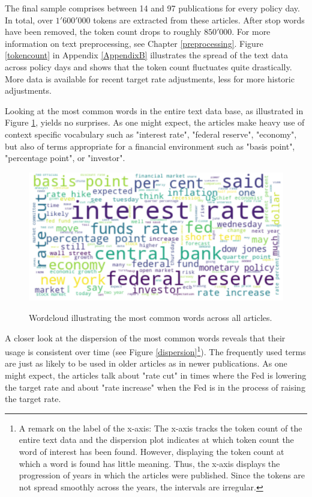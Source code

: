 \documentclass[11pt,a4paper,english,oneside]{book}
\numberwithin{equation}{chapter}
\begin{document}
The final sample comprises between 14 and 97 publications for every policy day. In total, over $1'600'000$ tokens are extracted from these articles. After stop words have been removed, the token count drops to roughly $850'000$. For more information on text preprocessing, see Chapter \ref{preprocessing}. Figure \ref{tokencount} in Appendix \ref{AppendixB} illustrates the spread of the text data across policy days and shows that the token count fluctuates quite drastically. More data is available for recent target rate adjustments, less for more historic adjustments.

Looking at the most common words in the entire text data base, as illustrated in Figure \ref{wcloud}, yields no surprises. As one might expect, the articles make heavy use of context specific vocabulary such as "interest rate", "federal reserve", "economy", but also of terms appropriate for a financial environment such as "basis point", "percentage point", or "investor". %

\begin{figure}
	\caption{Wordcloud illustrating the most common words across all articles.}
	\centering
	\includegraphics[scale=0.2]{Images/wordcloud.pdf}
	\label{wcloud}
\end{figure}

A closer look at the dispersion of the most common words reveals that their usage is consistent over time (see Figure \ref{dispersion}\footnote{A remark on the label of the x-axis: The x-axis tracks the token count of the entire text data and the dispersion plot indicates at which token count the word of interest has been found. However, displaying the token count at which a word is found has little meaning. Thus, the x-axis displays the progression of years in which the articles were published. Since the tokens are not spread smoothly across the years, the intervals are irregular.}). The frequently used terms are just as likely to be used in older articles as in newer publications. As one might expect, the articles talk about "rate cut" in times where the Fed is lowering the target rate and about "rate increase" when the Fed is in the process of raising the target rate.
\end{document}
